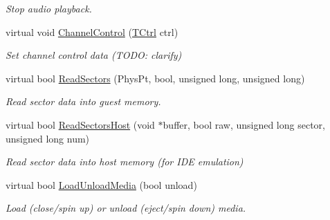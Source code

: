 \begin{DoxyCompactItemize}
\begin{DoxyCompactList}\small\item\em Stop audio playback. \end{DoxyCompactList}\item 
\hypertarget{classCDROM__Interface__SDL_a36747451cf2e7d18400fd5716947bca4}{virtual void \hyperlink{classCDROM__Interface__SDL_a36747451cf2e7d18400fd5716947bca4}{Channel\-Control} (\hyperlink{structSCtrl}{T\-Ctrl} ctrl)}\label{classCDROM__Interface__SDL_a36747451cf2e7d18400fd5716947bca4}

\begin{DoxyCompactList}\small\item\em Set channel control data (T\-O\-D\-O\-: clarify) \end{DoxyCompactList}\item 
\hypertarget{classCDROM__Interface__SDL_ae7079bbd9e22a19d2983ff4689cb914b}{virtual bool \hyperlink{classCDROM__Interface__SDL_ae7079bbd9e22a19d2983ff4689cb914b}{Read\-Sectors} (Phys\-Pt, bool, unsigned long, unsigned long)}\label{classCDROM__Interface__SDL_ae7079bbd9e22a19d2983ff4689cb914b}

\begin{DoxyCompactList}\small\item\em Read sector data into guest memory. \end{DoxyCompactList}\item 
\hypertarget{classCDROM__Interface__SDL_abe1fa6a654007a16c3d6d5423c69bfbe}{virtual bool \hyperlink{classCDROM__Interface__SDL_abe1fa6a654007a16c3d6d5423c69bfbe}{Read\-Sectors\-Host} (void $\ast$buffer, bool raw, unsigned long sector, unsigned long num)}\label{classCDROM__Interface__SDL_abe1fa6a654007a16c3d6d5423c69bfbe}

\begin{DoxyCompactList}\small\item\em Read sector data into host memory (for I\-D\-E emulation) \end{DoxyCompactList}\item 
\hypertarget{classCDROM__Interface__SDL_ae018393018fac0937b375dce79e31d0e}{virtual bool \hyperlink{classCDROM__Interface__SDL_ae018393018fac0937b375dce79e31d0e}{Load\-Unload\-Media} (bool unload)}\label{classCDROM__Interface__SDL_ae018393018fac0937b375dce79e31d0e}

\begin{DoxyCompactList}\small\item\em Load (close/spin up) or unload (eject/spin down) media. \end{DoxyCompactList}\end{DoxyCompactItemize}



